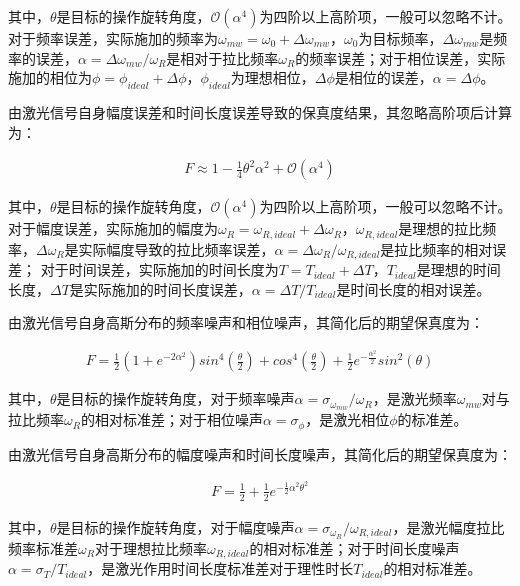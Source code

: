 其中，$\theta$是目标的操作旋转角度，$\mathcal{O}\left(\alpha^4\right)$为四阶以上高阶项，一般可以忽略不计。对于频率误差，实际施加的频率为$\omega_{mw}=\omega_0+\Delta\omega_{mw}$，$\omega_0$为目标频率，$\Delta\omega_{mw}$是频率的误差，$\alpha=\Delta\omega_{mw}/\omega_R$是相对于拉比频率$\omega_R$的频率误差；对于相位误差，实际施加的相位为$\phi=\phi_{ideal}+\Delta\phi$，$\phi_{ideal}$为理想相位，$\Delta\phi$是相位的误差，$\alpha=\Delta\phi$。

由激光信号自身幅度误差和时间长度误差导致的保真度结果，其忽略高阶项后计算为：

\begin{align}
    F\approx 1-\frac{1}{4}\theta^2\alpha^2+\mathcal{O}\left(\alpha^4\right)
\end{align}

其中，$\theta$是目标的操作旋转角度，$\mathcal{O}\left(\alpha^4\right)$为四阶以上高阶项，一般可以忽略不计。对于幅度误差，实际施加的幅度为$\omega_R=\omega_{R,ideal}+\Delta\omega_R$，$\omega_{R,ideal}$是理想的拉比频率，$\Delta\omega_R$是实际幅度导致的拉比频率误差，$\alpha=\Delta\omega_R/\omega_{R,ideal}$是拉比频率的相对误差；
对于时间误差，实际施加的时间长度为$T=T_{ideal}+\Delta T$，$T_{ideal}$是理想的时间长度，$\Delta T$是实际施加的时间长度误差，$\alpha=\Delta T/T_{ideal}$是时间长度的相对误差。

由激光信号自身高斯分布的频率噪声和相位噪声，其简化后的期望保真度为：

\begin{align}
    F=\frac{1}{2}\left(1+e^{-2\alpha^2}\right) sin^4\left(\frac{\theta}{2}\right)+cos^4\left(\frac{\theta}{2}\right)+\frac{1}{2} e^{-\frac{\alpha^2}{2}} sin^2\left(\theta\right)\label{eq:frequency_noise_fidelity}
\end{align}

其中，$\theta$是目标的操作旋转角度，对于频率噪声$\alpha=\sigma_{\omega_{mw}}/\omega_{R}$，是激光频率$\omega_{mw}$对与拉比频率$\omega_R$的相对标准差；对于相位噪声$\alpha=\sigma_{\phi}$，是激光相位$\phi$的标准差。

由激光信号自身高斯分布的幅度噪声和时间长度噪声，其简化后的期望保真度为：

\begin{align}
    F=\frac{1}{2}+\frac{1}{2} e^{-\frac{1}{2}\alpha^2\theta^2}\label{eq:amplitude_noise_fidelity}
\end{align}

其中，$\theta$是目标的操作旋转角度，对于幅度噪声$\alpha=\sigma_{\omega_R}/\omega_{R,ideal}$，是激光幅度拉比频率标准差$\omega_R$对于理想拉比频率$\omega_{R,ideal}$的相对标准差；对于时间长度噪声$\alpha=\sigma_{T}/T_{ideal}$，是激光作用时间长度标准差对于理性时长$T_{ideal}$的相对标准差。

